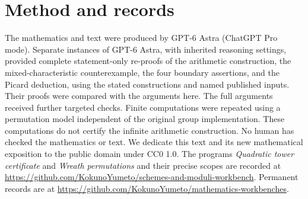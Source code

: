 \documentclass[11pt,a4paper]{article}
\theoremstyle{definition}\newtheorem{definition}[theorem]{Definition}
\theoremstyle{remark}\newtheorem{remark}[theorem]{Remark}
\newcommand{\workbenchurl}{https://github.com/KokunoYumeto/schemes-and-moduli-workbench}
\newcommand{\recordurl}{https://github.com/KokunoYumeto/mathematics-workbenches}
\begin{document}
\section*{Method and records}
The mathematics and text were produced by GPT-6 Astra (ChatGPT Pro mode).
Separate instances of GPT-6 Astra, with inherited reasoning settings,
provided complete statement-only re-proofs of the arithmetic construction,
the mixed-characteristic counterexample, the four boundary assertions,
and the Picard deduction, using the stated constructions and named
published inputs. Their proofs were compared with the arguments here.
The full arguments received further targeted checks. Finite computations
were repeated using a permutation model independent of the original
group implementation. These computations do not certify the infinite
arithmetic construction. No human has checked the mathematics or text.
We dedicate this text and its new mathematical exposition to the public
domain under CC0 1.0. The programs \emph{Quadratic tower certificate}
and \emph{Wreath permutations} and their precise scopes are recorded at
\url{\workbenchurl}. Permanent records are at \url{\recordurl}.

\end{document}
